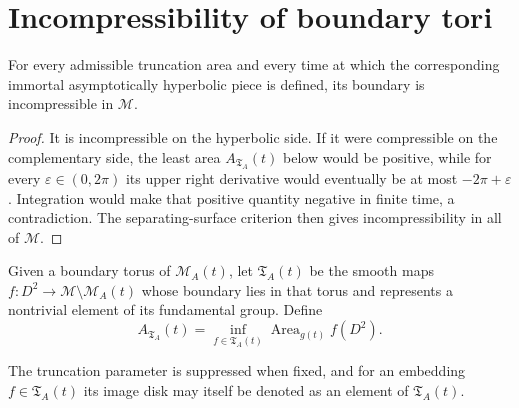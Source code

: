 \section{Incompressibility of boundary tori}

\begin{theorem}
\label{thm:chow-iv-immortal-piece-boundary-incompressible}
For every admissible truncation area and every time at which the corresponding
immortal asymptotically hyperbolic piece is defined, its boundary is
incompressible in \(\mathcal M\).
\end{theorem}

\begin{proof}
\sketch
It is incompressible on the hyperbolic side.  If it were compressible on the
complementary side, the least area \(A_{\mathfrak T_A}(t)\) below would be
positive, while for every \(\varepsilon\in(0,2\pi)\) its upper right derivative
would eventually be at most \(-2\pi+\varepsilon\).  Integration would make
that positive quantity negative in finite time, a contradiction.  The
separating-surface criterion then gives incompressibility in all of
\(\mathcal M\).
\end{proof}

\begin{definition}
\label{def:chow-iv-disk-class-almost-piece}
Given a boundary torus of \(\mathcal M_A(t)\), let
\(\mathfrak T_A(t)\) be the smooth maps \(f:D^2\to\mathcal M\setminus
\mathcal M_A(t)\) whose boundary lies in that torus and represents a nontrivial
element of its fundamental group.  Define
\[
 A_{\mathfrak T_A}(t)=\inf_{f\in\mathfrak T_A(t)}
 \operatorname{Area}_{g(t)}f(D^2).
\]
\end{definition}

\begin{remark}
\label{rem:chow-iv-disk-class-notation}
The truncation parameter is suppressed when fixed, and for an embedding
\(f\in\mathfrak T_A(t)\) its image disk may itself be denoted as an element of
\(\mathfrak T_A(t)\).
\end{remark}

